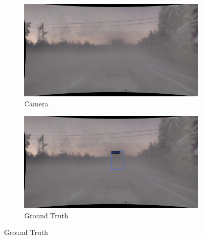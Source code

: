 \documentclass[report.tex]{subfiles}
\begin{document}
    \begin{figure}[ht]
        \centering
        
        \begin{subfigure}{.5\textwidth}
            \centering
            \includegraphics[width=.9\linewidth]{images/adverse_weather_influence_on_sensor/camera_1.png}
            \caption{Camera}
            \label{fig:sub1}
        \end{subfigure}%
        \begin{subfigure}{.5\textwidth}
            \centering
            \includegraphics[width=.9\linewidth]{images/adverse_weather_influence_on_sensor/gt.png}
            \caption{Ground Truth}
            \label{fig:sub2}
        \end{subfigure}
        

\end{figure}
\end{document}
